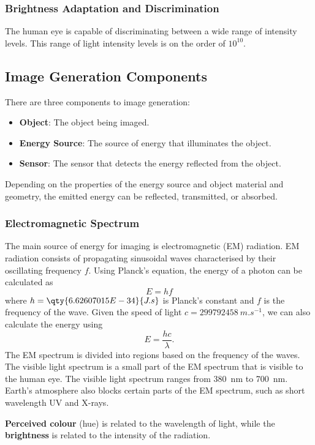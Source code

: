 \documentclass{article}
\begin{document}
\subsubsection{Brightness Adaptation and Discrimination}
The human eye is capable of discriminating between a wide range of
intensity levels. This range of light intensity levels is on the order
of \(10^{10}\).
\subsection{Image Generation Components}
There are three components to image generation:
\begin{itemize}
    \item \textbf{Object}: The object being imaged.
    \item \textbf{Energy Source}: The source of energy that illuminates the object.
    \item \textbf{Sensor}: The sensor that detects the energy reflected from the object.
\end{itemize}
Depending on the properties of the energy source and object material and
geometry, the emitted energy can be reflected, transmitted, or absorbed.
\subsubsection{Electromagnetic Spectrum}
The main source of energy for imaging is electromagnetic (EM)
radiation. EM radiation consists of propagating sinusoidal waves
characterised by their oscillating frequency \(f\). Using Planck's
equation, the energy of a photon can be calculated as
\begin{equation*}
    E = hf
\end{equation*}
where \(h = \qty{6.62607015E-34}{J.s}\) is Planck's constant and \(f\) is the frequency of the wave.
Given the speed of light \(c = \qty{299792458}{m.s^{-1}}\), we can also calculate the energy using
\begin{equation*}
    E = \frac{hc}{\lambda}.
\end{equation*}
The EM spectrum is divided into regions based on the frequency of the
waves. The visible light spectrum is a small part of the EM spectrum
that is visible to the human eye. The visible light spectrum ranges
from \qty{380}{nm} to \qty{700}{nm}. Earth's atmosphere also blocks
certain parts of the EM spectrum, such as short wavelength UV and X-rays.

\textbf{Perceived colour} (hue) is related to the wavelength of light,
while the \textbf{brightness} is related to the intensity of the
radiation.
\end{document}
